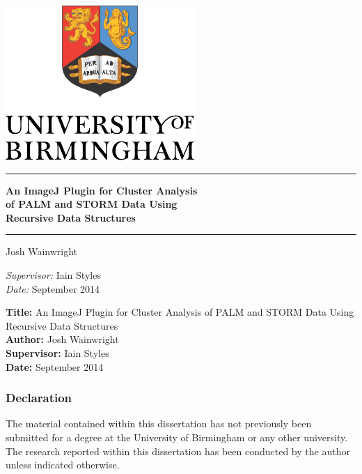 
\begin{titlepage}
	\begin{center}
		\vspace*{\fill}

		\centering
		\includegraphics[scale=1.3]{Logo.pdf}
		\vfill

		\hrule
		{\LARGE\bf An ImageJ Plugin for Cluster Analysis \\
			of PALM and STORM Data Using \\
			Recursive Data Structures \\[0.4cm]}
		\hrule

		\vfill
		{\Large Josh Wainwright}
		\vfill

		\vfill
		\textit{Supervisor:} Iain Styles \\
		\vfill
		\textit{Date:} September 2014
		\vfill
		\vfill

	\end{center}
\end{titlepage}

\thispagestyle{empty}

\textbf{Title:} An ImageJ Plugin for Cluster Analysis of PALM and STORM Data
Using Recursive Data Structures \\
\textbf{Author:} Josh Wainwright \\
\textbf{Supervisor:} Iain Styles \\
\textbf{Date:} September 2014 \\
\textbf{}
\vfill
\vfill

\subsubsection*{Declaration}

The material contained within this dissertation has not previously been
submitted for a degree at the University of Birmingham or any other university.
The research reported within this dissertation has been conducted by the author
unless indicated otherwise.\\

